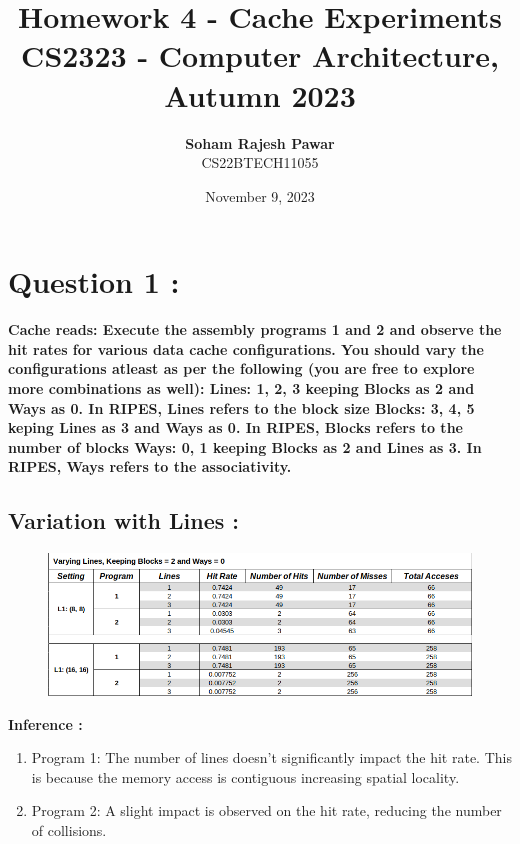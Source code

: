 \documentclass{article}
\title{\textbf{\LARGE Homework 4 - Cache Experiments}\\[2ex] \large CS2323 - Computer Architecture, Autumn 2023}
\author{\textbf{\large{Soham Rajesh Pawar}}\\ CS22BTECH11055}
\date{November 9, 2023}
\begin{document}
\maketitle

\section{Question 1 :}
\textbf{\large{
Cache reads: Execute the assembly programs 1 and 2 and observe the hit rates for various data cache configurations.
You should vary the configurations atleast as per the following (you are free to explore more combinations as well):
Lines: 1, 2, 3 keeping Blocks as 2 and Ways as 0. In RIPES, Lines refers to the block size
Blocks: 3, 4, 5 keping Lines as 3 and Ways as 0. In RIPES, Blocks refers to the number of blocks
Ways: 0, 1 keeping Blocks as 2 and Lines as 3. In RIPES, Ways refers to the associativity.
}}
\subsection{Variation with Lines :}
\begin{figure}[H]
  \centering
  \includegraphics[width=1\textwidth]{1.1.png}
  \label{fig:example}
\end{figure}
\noindent
\textbf{\large{Inference :}}\\
\begin{enumerate}[label=\alph*)]
  \item Program 1: The number of lines doesn't significantly impact the hit rate. This is because the memory access is contiguous increasing spatial locality.
  \item Program 2: A slight impact is observed on the hit rate, reducing the number of collisions.
\end{enumerate}
\smallskip
\end{document}
